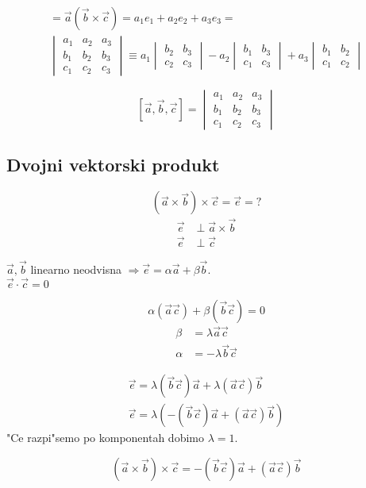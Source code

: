 \begin{align*}
	[\vec{a}, \vec{b}, \vec{c}] = \vec{a} (\vec{b} \times \vec{c}) = a_1e_1 + a_2e_2 + a_3e_3 =\\
	\begin{vmatrix}
	a_1 & a_2 & a_3 \\
	b_1 & b_2 & b_3 \\
	c_1 & c_2 & c_3
	\end{vmatrix} \equiv
	a_1 \begin{vmatrix}
	b_2 & b_3\\
	c_2 & c_3
	\end{vmatrix} - a_2
	\begin{vmatrix}
	b_1 & b_3 \\
	c_1 & c_3
	\end{vmatrix} + a_3
	\begin{vmatrix}
	b_1 & b_2\\
	c_1 & c_2
	\end{vmatrix}
\end{align*}

\[[\vec{a}, \vec{b}, \vec{c}] = \begin{vmatrix}
a_1 & a_2 & a_3 \\
b_1 & b_2 & b_3 \\
c_1 & c_2 & c_3
\end{vmatrix}\]

\subsection{Dvojni vektorski produkt}
\[(\vec{a} \times \vec{b}) \times \vec{c} = \vec{e} = ?\]
\begin{align*}
	\vec{e} &\perp \vec{a} \times \vec{b} \\
	\vec{e} &\perp \vec{c}
\end{align*}

$\vec{a}, \vec{b}$ linearno neodvisna $\Rightarrow \vec{e} = \alpha \vec{a} + \beta \vec{b}$.\\
$\vec{e} \cdot \vec{c} = 0$

\[\alpha (\vec{a} \vec{c}) + \beta (\vec{b} \vec{c}) = 0\]
\begin{align*}
	\beta &= \lambda \vec{a} \vec{c}\\
	\alpha &= - \lambda \vec{b} \vec{c}
\end{align*}

\begin{align*}
	\vec{e} = \lambda(\vec{b} \vec{c}) \vec{a} + \lambda (\vec{a} \vec{c}) \vec{b}\\
	\vec{e} = \lambda(-(\vec{b} \vec{c}) \vec{a} + (\vec{a}\vec{c}) \vec{b})
\end{align*}
"Ce razpi"semo po komponentah dobimo $\lambda = 1$.

\[(\vec{a} \times \vec{b}) \times \vec{c} = -(\vec{b} \vec{c}) \vec{a} + (\vec{a} \vec{c}) \vec{b}\]